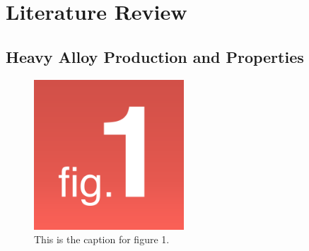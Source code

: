 
\chapter{Literature Review}

\label{Chapter2}


\section{Heavy Alloy Production and Properties}
\label{Heavy Alloy Production and Properties}
\lipsum[2]

\begin{figure}[H]
    \centering
    \includegraphics[width=0.5\textwidth]{images/Figure 1.png}
    \caption{This is the caption for figure 1.}
    \label{figure:chap2_Figure_2}
\end{figure}